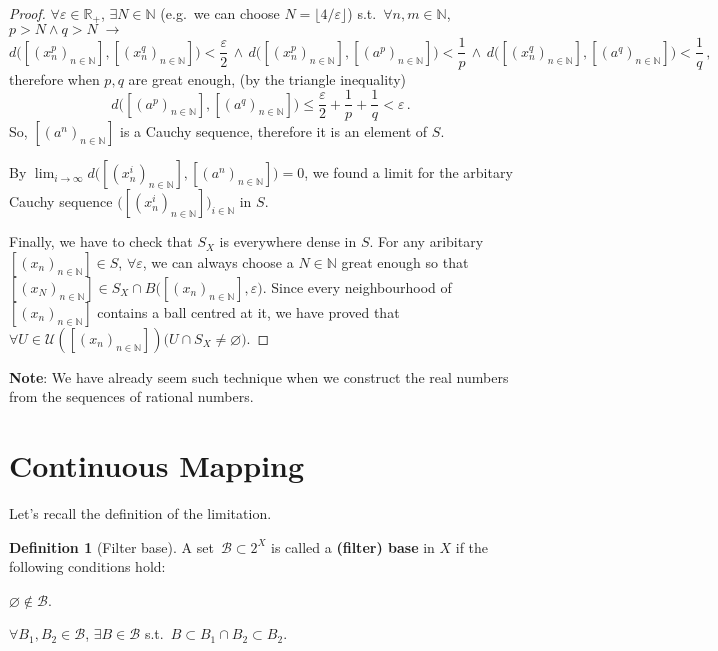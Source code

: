 \documentclass[openany]{book}
\theoremstyle{plain}
\theoremstyle{definition}
\newtheorem{definition}{Definition}[section] %
\begin{document}
\begin{proof}
	$\forall \varepsilon \in \mathbb R_+$, $\exists N \in \mathbb N$ 
		(e.g.\ we can choose $N = \lfloor 4/\varepsilon\rfloor$) 
	s.t.\ $\forall n, m \in \mathbb N$, $p > N \wedge q > N \;\to$
	\begin{equation*}
		d\big([(x^p_n)_{n \in \mathbb N}], [(x^q_n)_{n \in \mathbb N}]\big) < \frac \varepsilon 2
		\,\wedge\,
		d\big([(x^p_n)_{n \in \mathbb N}], [(a^p)_{n \in \mathbb N}]\big) < \frac 1 p
		\,\wedge\,
		d\big([(x^q_n)_{n \in \mathbb N}], [(a^q)_{n \in \mathbb N}]\big) < \frac 1 q
		\,,
	\end{equation*}
	therefore when $p, q$ are great enough, (by the triangle inequality)
	\begin{equation*}
		d\big([(a^p)_{n \in \mathbb N}], [(a^q)_{n \in \mathbb N}]\big) 
		\leq \frac \varepsilon 2 + \frac 1 p + \frac 1 q 
		< \varepsilon\,.
	\end{equation*}
	So, $[(a^n)_{n \in \mathbb N}]$ is a Cauchy sequence, therefore it is an element of $S$. 
	
	By $\lim_{i \to \infty} d\big([(x^i_n)_{n \in \mathbb N}], [(a^n)_{n \in \mathbb N}]\big) = 0$, we found a limit for the arbitary Cauchy sequence $\big([(x^i_n)_{n \in \mathbb N}]\big)_{i \in \mathbb N}$ in $S$.

	Finally, we have to check that $S_X$ is everywhere dense in $S$. For any aribitary $[(x_n)_{n \in \mathbb N}] \in S$, $\forall \varepsilon$, we can always choose a $N \in \mathbb N$ great enough so that $[(x_N)_{n \in \mathbb N}] \in S_X \cap B\big([(x_n)_{n \in \mathbb N}], \varepsilon\big)$. 
	Since every neighbourhood of $[(x_n)_{n \in \mathbb N}]$ contains a ball centred at it, we have proved that $\forall U \in \mathscr U([(x_n)_{n \in \mathbb N}]) \big( U \cap S_X \neq \varnothing \big)$.
\end{proof}

\textbf{Note}: We have already seem such technique when we construct the real numbers from the sequences of rational numbers.

\section{Continuous Mapping}
Let's recall the definition of the limitation.

\begin{definition}[Filter base]\label{definition: filter base}
	A set~$\mathscr{B} \subset 2^X$ is called a \textbf{(filter) base} in $X$ if the following conditions hold:
	\begin{conditionlist}[label=\alph*)]
		\item $\varnothing \notin \mathscr{B}$.
		\item $\forall B_1, B_2 \in \mathscr{B}$, $\exists B \in \mathscr{B}$ s.t.\ $B \subset B_1 \cap B_2 \subset B_2$. 
	\end{conditionlist}
\end{definition}
\end{document}
